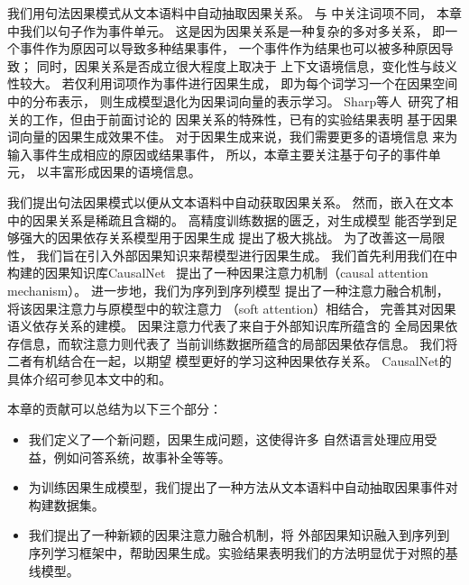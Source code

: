 我们用句法因果模式从文本语料中自动抽取因果关系。
与
中关注词项不同，
本章中我们以句子作为事件单元。
这是因为因果关系是一种复杂的多对多关系，
即一个事件作为原因可以导致多种结果事件，
一个事件作为结果也可以被多种原因导致；
同时，因果关系是否成立很大程度上取决于
上下文语境信息，变化性与歧义性较大。
若仅利用词项作为事件进行因果生成，
即为每个词学习一个在因果空间中的分布表示，
则生成模型退化为因果词向量的表示学习。
Sharp等人~\cite{sharp2016creating,zhao2017constructing}研究了相关的工作，但由于前面讨论的
因果关系的特殊性，已有的实验结果表明
基于因果词向量的因果生成效果不佳。
对于因果生成来说，我们需要更多的语境信息
来为输入事件生成相应的原因或结果事件，
所以，本章主要关注基于句子的事件单元，
以丰富形成因果的语境信息。

我们提出句法因果模式以便从文本语料中自动获取因果关系。
然而，嵌入在文本中的因果关系是稀疏且含糊的。
高精度训练数据的匮乏，对生成模型
能否学到足够强大的因果依存关系模型用于因果生成
提出了极大挑战。
为了改善这一局限性，
我们旨在引入外部因果知识来帮模型进行因果生成。
我们首先利用我们在中
构建的因果知识库CausalNet~\cite{luo2016commonsense}
提出了一种因果注意力机制（causal attention mechanism）。
进一步地，我们为序列到序列模型
提出了一种注意力融合机制，
将该因果注意力与原模型中的软注意力
（soft attention）相结合，
完善其对因果语义依存关系的建模。
因果注意力代表了来自于外部知识库所蕴含的
全局因果依存信息，而软注意力则代表了
当前训练数据所蕴含的局部因果依存信息。
我们将二者有机结合在一起，以期望
模型更好的学习这种因果依存关系。
CausalNet的具体介绍可参见本文中的和。

本章的贡献可以总结为以下三个部分：

\begin{itemize}
	\item 我们定义了一个新问题，因果生成问题，这使得许多
	自然语言处理应用受益，例如问答系统，故事补全等等。
	\item 为训练因果生成模型，我们提出了一种方法从文本语料中自动抽取因果事件对构建数据集。
	\item 我们提出了一种新颖的因果注意力融合机制，将
	外部因果知识融入到序列到序列学习框架中，帮助因果生成。实验结果表明我们的方法明显优于对照的基线模型。
\end{itemize}


